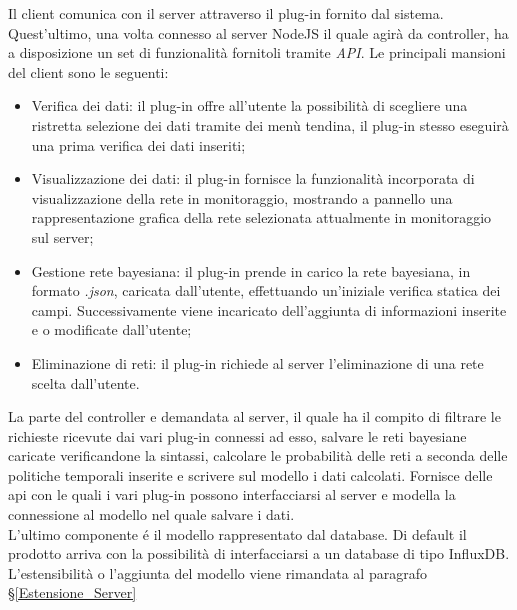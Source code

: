 Il client comunica con il server attraverso il plug-in fornito dal sistema. Quest'ultimo, una volta connesso al server NodeJS il quale agirà da controller, ha a disposizione un set di funzionalità fornitoli tramite \textit{API}\glossario . Le principali mansioni del client sono le seguenti: 
\begin{itemize}
	\item Verifica dei dati: il plug-in offre all'utente la possibilità di scegliere una ristretta selezione dei dati tramite dei menù tendina, il plug-in stesso eseguirà una prima verifica dei dati inseriti;
	\item Visualizzazione dei dati: il plug-in fornisce la funzionalità incorporata di visualizzazione della rete in monitoraggio, mostrando a pannello una rappresentazione grafica della rete selezionata attualmente in monitoraggio sul server;
	\item Gestione rete bayesiana: il plug-in prende in carico la rete bayesiana, in formato \textit{.json}, caricata dall'utente, effettuando un'iniziale verifica statica dei campi. Successivamente viene incaricato dell'aggiunta di informazioni inserite e o modificate dall'utente; 
	\item Eliminazione di reti: il plug-in richiede al server l'eliminazione di una rete scelta dall'utente. 
\end{itemize}
La parte del controller e demandata al server, il quale ha il compito di filtrare le richieste ricevute dai vari plug-in connessi ad esso, salvare le reti bayesiane caricate verificandone la sintassi, calcolare le probabilità delle reti a seconda delle politiche temporali inserite e scrivere sul modello i dati calcolati. 
Fornisce delle api con le quali i vari plug-in possono interfacciarsi al server e modella la connessione al modello nel quale salvare i dati. \\ 
L'ultimo componente é il modello rappresentato dal database. Di default il prodotto arriva con la possibilità di interfacciarsi a un database
di tipo InfluxDB. L'estensibilità o l'aggiunta del modello viene rimandata al paragrafo §\ref{Estensione_Server}


